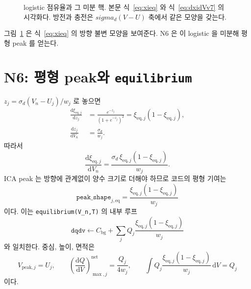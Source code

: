 \documentclass[11pt,a4paper]{article}
\newcommand{\dd}{\mathrm{d}}
\newcommand{\bg}{\mathrm{bg}}
\newcommand{\eq}{\mathrm{eq}}
\newcommand{\peak}{\mathrm{peak}}
\begin{document}
\begin{figure}[t]
\centering
{}
\caption{logistic 점유율과 그 미분 핵. 본문 식~\eqref{eq:xieq} 와 식~\eqref{eq:dxidVv7} 의 시각화다. 방전과 충전은 $sigma_d(V-U)$ 축에서 같은 모양을 갖는다.}
\label{fig:logistic}
\end{figure}

그림~\ref{fig:logistic} 은 식~\eqref{eq:xieq} 의 방향 불변 모양을 보여준다. N6 은 이 logistic 을 미분해 평형 peak 를 얻는다.

\section{N6: 평형 peak와 \texttt{equilibrium}}\label{sec:n6}
$z_j=\sigma_d(V_n-U_j)/w_j$ 로 놓으면
\begin{align}
\frac{\dd \xi_{\eq,j}}{\dd z_j}
&=\frac{e^{-z_j}}{(1+e^{-z_j})^2}
=\xi_{\eq,j}(1-\xi_{\eq,j}),\label{eq:dxidz}\\
\frac{\dd z_j}{\dd V_n}
&=\frac{\sigma_d}{w_j}.
\label{eq:dzdV}
\end{align}
따라서
\begin{equation}
\frac{\dd\xi_{\eq,j}}{\dd V_n}
=\frac{\sigma_d\,\xi_{\eq,j}(1-\xi_{\eq,j})}{w_j}.
\label{eq:dxidVv7}
\end{equation}
ICA peak 는 방향에 관계없이 양수 크기로 더해야 하므로 코드의 평형 기여는
\begin{equation}
\boxed{\;\texttt{peak\_shape}_{j,\eq}
=\frac{\xi_{\eq,j}(1-\xi_{\eq,j})}{w_j}\;}
\label{eq:eqpeakv7}
\end{equation}
이다. 이는 \texttt{equilibrium(V\_n,T)} 의 내부 루프
\begin{equation}
\texttt{dqdv}\leftarrow C_\bg+\sum_j Q_j\frac{\xi_{\eq,j}(1-\xi_{\eq,j})}{w_j}
\label{eq:equilibrium}
\end{equation}
와 일치한다. 중심, 높이, 면적은
\begin{equation}
V_{\peak,j}=U_j,\qquad
\left(\frac{\dd Q}{\dd V}\right)_{\max,j}^{\mathrm{net}}=\frac{Q_j}{4w_j},\qquad
\int Q_j\frac{\xi_{\eq,j}(1-\xi_{\eq,j})}{w_j}\,\dd V=Q_j
\label{eq:eqprops}
\end{equation}
이다.
\end{document}
